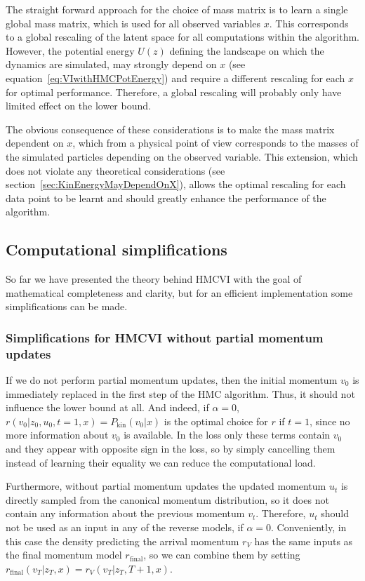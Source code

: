 The straight forward approach for the choice of mass matrix is to learn a single global mass matrix, which is used for all observed variables $x$. This corresponds to a global rescaling of the latent space for all computations within the algorithm. However, the potential energy $U(z)$ defining the landscape on which the dynamics are simulated, may strongly depend on $x$ (see equation~\eqref{eq:VIwithHMCPotEnergy}) and require a different rescaling for each $x$ for optimal performance. Therefore, a global rescaling will probably only have limited effect on the lower bound.

The obvious consequence of these considerations is to make the mass matrix dependent on $x$, which from a physical point of view corresponds to the masses of the simulated particles depending on the observed variable. This extension, which does not violate any theoretical considerations (see section~\ref{sec:KinEnergyMayDependOnX}), allows the optimal rescaling for each data point to be learnt and should greatly enhance the performance of the algorithm.

\subsection{Computational simplifications}

So far we have presented the theory behind HMCVI with the goal of mathematical completeness and clarity, but for an efficient implementation some simplifications can be made.

\subsubsection{Simplifications for HMCVI without partial momentum updates}
\label{sec:SimplificationWithoutPartialMomentumUpdate}
If we do not perform partial momentum updates, then the initial momentum $v_0$ is immediately replaced in the first step of the HMC algorithm. Thus, it should not influence the lower bound at all. And indeed, if $\alpha = 0$, $r(v_0|z_0, u_0, t=1, x) = P_\textrm{kin}(v_0|x)$ is the optimal choice for $r$ if $t=1$, since no more information about $v_0$ is available. In the loss only these terms contain $v_0$ and they appear with opposite sign in the loss, so by simply cancelling them instead of learning their equality we can reduce the computational load.

Furthermore, without partial momentum updates the updated momentum $u_t$ is directly sampled from the canonical momentum distribution, so it does not contain any information about the previous momentum $v_t$. Therefore, $u_t$ should not be used as an input in any of the reverse models, if $\alpha=0$. Conveniently, in this case the density predicting the arrival momentum $r_V$ has the same inputs as the final momentum model $r_\textrm{final}$, so we can combine them by setting $r_\textrm{final}(v_T | z_T, x) = r_V(v_T | z_T, T+1, x)$.

